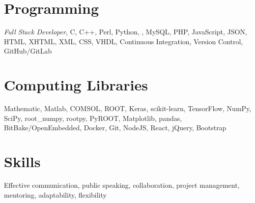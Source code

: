 \documentclass[margin,line]{resume}
\let\origsection\section%
\let\section\subsection%
\let\section\origsection%
\begin{document}
\begin{resume}
\section{\mysidestyle Programming}

\textsl{Full Stack Developer}, C, C++, Perl, Python, \LaTeXe, MySQL, PHP, JavaScript, JSON, HTML, XHTML, XML, CSS, VHDL, Continuous Integration, Version Control, GitHub/GitLab

\section{\mysidestyle Computing Libraries}

Mathematic, Matlab, COMSOL, ROOT, Keras, scikit-learn, TensorFlow, NumPy, SciPy, root\_numpy, rootpy, PyROOT, Matplotlib, pandas, BitBake/OpenEmbedded, Docker, Git, NodeJS, React, jQuery, Bootstrap

\section{\mysidestyle Skills}

Effective communication, public speaking, collaboration, project management, mentoring, adaptability, flexibility

%
%
\end{resume}
\end{document}
